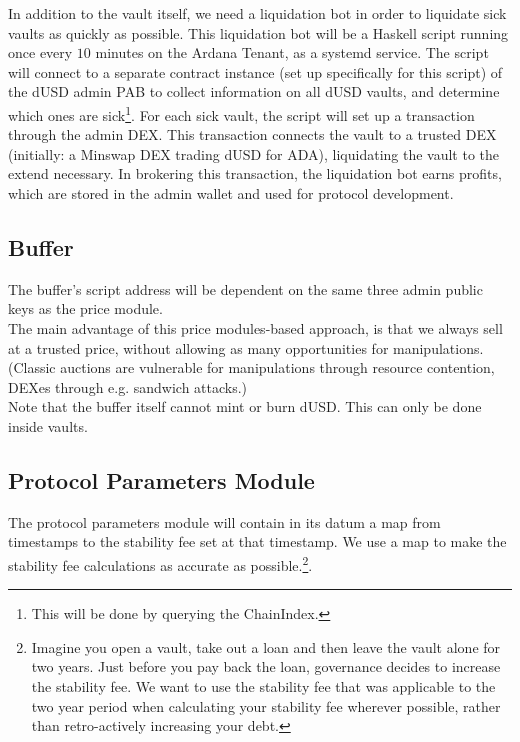 \documentclass{article} %
\begin{document}
In addition to the vault itself, we need a liquidation bot in order to liquidate
sick vaults as quickly as possible.
This liquidation bot will be a Haskell script running once every $10$ minutes on
the Ardana Tenant, as a systemd service.
The script will connect to a separate contract instance (set up specifically for
this script) of the dUSD admin PAB to collect information on all dUSD vaults,
and determine which ones are sick\footnote{
  This will be done by querying the ChainIndex.
}.
For each sick vault, the script will set up a transaction through the admin DEX.
This transaction connects the vault to a trusted DEX (initially: a Minswap DEX
trading dUSD for ADA), liquidating the vault to the extend necessary.
In brokering this transaction, the liquidation bot earns profits, which are
stored in the admin wallet and used for protocol development.

\subsection{Buffer}

The buffer's script address will be dependent on the same three admin public
keys as the price module. \\

The main advantage of this price modules-based approach, is that we always sell
at a trusted price, without allowing as many opportunities for manipulations.
(Classic auctions are vulnerable for manipulations through resource contention,
DEXes through e.g. sandwich attacks.) \\

Note that the buffer itself cannot mint or burn dUSD. This can only be done
inside vaults.

\subsection{Protocol Parameters Module}

The protocol parameters module will contain in its datum a map from timestamps
to the stability fee set at that timestamp.
We use a map to make the stability fee calculations as accurate as
possible.\footnote{
  Imagine you open a vault, take out a loan and then leave the vault alone for
  two years.
  Just before you pay back the loan, governance decides to increase the
  stability fee.
  We want to use the stability fee that was applicable to the two year period
  when calculating your stability fee wherever possible, rather than
  retro-actively increasing your debt.
}. \\
\end{document}
